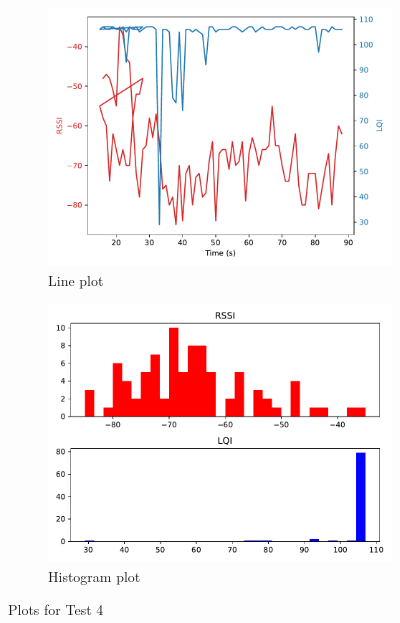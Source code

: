 \documentclass[runningheads]{llncs}
\begin{document}
\begin{figure}[ht]
    \centering
    \begin{subfigure}[b]{0.45\textwidth}
        \centering
        \includegraphics[width=\textwidth]{images/1-50-7-26-line.pdf}
        \caption{Line plot}
    \end{subfigure}
    \hfill
    \begin{subfigure}[b]{0.45\textwidth}
        \centering
        \includegraphics[width=\textwidth]{images/1-50-7-26-histogram.pdf}
        \caption{Histogram plot}
    \end{subfigure}
    \caption{Plots for Test 4}
\end{figure}
\end{document}
